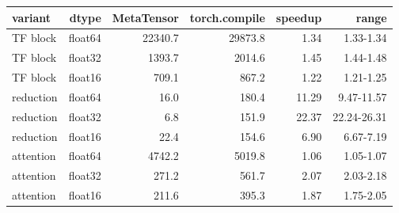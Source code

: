 \begin{tabular}{lrrrrr}
\toprule
variant & dtype & MetaTensor & torch.compile & speedup & range \\
\midrule
TF block & float64 & 22340.7 & 29873.8 & 1.34 & 1.33-1.34 \\
TF block & float32 & 1393.7 & 2014.6 & 1.45 & 1.44-1.48 \\
TF block & float16 & 709.1 & 867.2 & 1.22 & 1.21-1.25 \\
reduction & float64 & 16.0 & 180.4 & 11.29 & 9.47-11.57 \\
reduction & float32 & 6.8 & 151.9 & 22.37 & 22.24-26.31 \\
reduction & float16 & 22.4 & 154.6 & 6.90 & 6.67-7.19 \\
attention & float64 & 4742.2 & 5019.8 & 1.06 & 1.05-1.07 \\
attention & float32 & 271.2 & 561.7 & 2.07 & 2.03-2.18 \\
attention & float16 & 211.6 & 395.3 & 1.87 & 1.75-2.05 \\
\bottomrule
\end{tabular}
